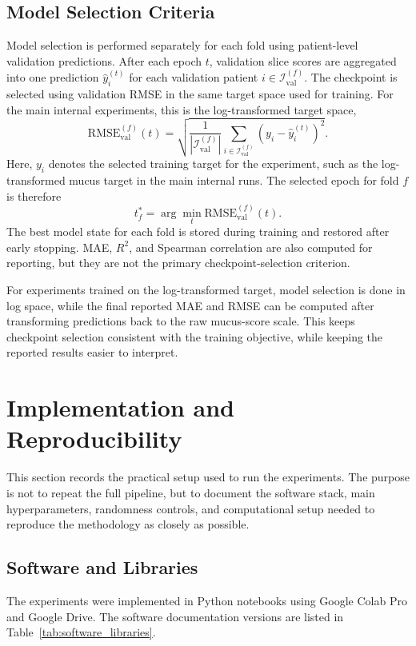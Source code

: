 \subsection{Model Selection Criteria}
\label{sec:model_selection_criteria}
Model selection is performed separately for each fold using patient-level validation predictions. After each epoch \(t\), validation slice scores are aggregated into one prediction \(\hat{y}_i^{(t)}\) for each validation patient \(i \in \mathcal{I}_{\mathrm{val}}^{(f)}\). The checkpoint is selected using validation RMSE in the same target space used for training. For the main internal experiments, this is the log-transformed target space,
\[
\mathrm{RMSE}_{\mathrm{val}}^{(f)}(t)
=
\sqrt{
\frac{1}{|\mathcal{I}_{\mathrm{val}}^{(f)}|}
\sum_{i\in\mathcal{I}_{\mathrm{val}}^{(f)}}
\left(y_i-\hat{y}_i^{(t)}\right)^2
}.
\]
Here, \(y_i\) denotes the selected training target for the experiment, such as the log-transformed mucus target in the main internal runs. The selected epoch for fold \(f\) is therefore
\[
t_f^{*}
=
\arg\min_t
\mathrm{RMSE}_{\mathrm{val}}^{(f)}(t).
\]
The best model state for each fold is stored during training and restored after early stopping. MAE, \(R^2\), and Spearman correlation are also computed for reporting, but they are not the primary checkpoint-selection criterion.

For experiments trained on the log-transformed target, model selection is done in log space, while the final reported MAE and RMSE can be computed after transforming predictions back to the raw mucus-score scale. This keeps checkpoint selection consistent with the training objective, while keeping the reported results easier to interpret.


\section{Implementation and Reproducibility}
\label{sec:implementation_reproducibility}
This section records the practical setup used to run the experiments. The purpose is not to repeat the full pipeline, but to document the software stack, main hyperparameters, randomness controls, and computational setup needed to reproduce the methodology as closely as possible.


\subsection{Software and Libraries}
\label{sec:software_libraries}
The experiments were implemented in Python notebooks using Google Colab Pro and Google Drive. The software documentation versions are listed in Table~\ref{tab:software_libraries}. 

